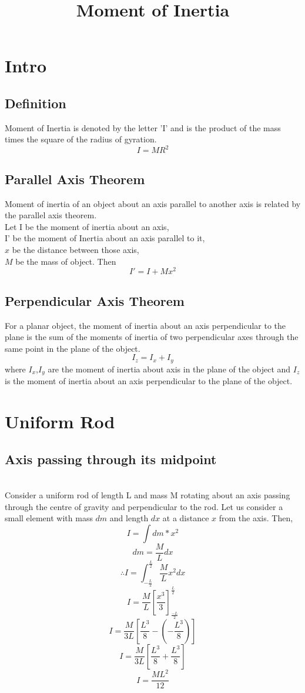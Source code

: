 \documentclass{article}
\title{Moment of Inertia}
\begin{document}
\maketitle
\tableofcontents

\section{Intro}
\subsection{Definition}
Moment of Inertia is denoted by the letter 'I' and is the product of the mass times the square of the radius of gyration.
$$ I = M R^2$$
\subsection{Parallel Axis Theorem}
Moment of inertia of an object about an axis parallel to another axis is related by the parallel axis theorem.\\
Let I be the moment of inertia about an axis,\\
I' be the moment of Inertia about an axis parallel to it,\\
$x$ be the distance between those axis,\\
$M$ be the mass of object. Then
$$I' = I + M x^2$$

\subsection{Perpendicular Axis Theorem}
For a planar object, the moment of inertia about an axis perpendicular to the plane is the sum of the moments of inertia of two perpendicular axes through the same point in the plane of the object.
$$ I_z = I_x + I_y$$
where $I_x$,$I_y$ are the moment of inertia about axis in the plane of the object and $I_z$ is the moment of inertia about an axis perpendicular to the plane of the object.

\section{Uniform Rod}
\subsection{Axis passing through its midpoint}
\\
Consider a uniform rod of length L and mass M rotating about an axis passing through the centre of gravity and perpendicular to the rod.
Let us consider a small element with mass $dm$ and length $dx$ at a distance $x$ from the axis. Then,
$$I = \int dm*x^2$$
$$dm = \frac{M}{L} dx$$
$$\therefore I = \int_{-\frac{L}{2}}^{\frac{L}{2}} \frac{M}{L} x^2 dx$$
$$ I = \frac{M}{L} \left[ \frac{x^3}{3} \right]_{\frac{-L}{2}}^{\frac{L}{2}}$$
$$ I = \frac{M}{3L} \left[ \frac{L^3}{8} - \left(-\frac{L^3}{8}\right) \right]$$
$$ I = \frac{M}{3L} \left[ \frac{L^3}{8} + \frac{L^3}{8} \right]$$
$$ \boxed{I = \frac{ML^2}{12}} $$
\end{document}
